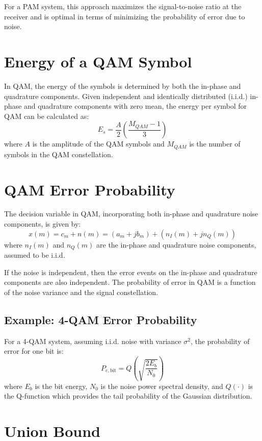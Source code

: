For a PAM system, this approach maximizes the signal-to-noise ratio at the receiver and is optimal in terms of minimizing the probability of error due to noise.
\section*{Energy of a QAM Symbol}

In QAM, the energy of the symbols is determined by both the in-phase and quadrature components. Given independent and identically distributed (i.i.d.) in-phase and quadrature components with zero mean, the energy per symbol for QAM can be calculated as:
\[
E_s = \frac{A}{2} \left( \frac{M_{QAM} - 1}{3} \right)
\]
where \( A \) is the amplitude of the QAM symbols and \( M_{QAM} \) is the number of symbols in the QAM constellation.

\section*{QAM Error Probability}

The decision variable in QAM, incorporating both in-phase and quadrature noise components, is given by:
\[
x(m) = c_m + n(m) = (a_m + jb_m) + (n_I(m) + jn_Q(m))
\]
where \( n_I(m) \) and \( n_Q(m) \) are the in-phase and quadrature noise components, assumed to be i.i.d.

If the noise is independent, then the error events on the in-phase and quadrature components are also independent. The probability of error in QAM is a function of the noise variance and the signal constellation.

\subsection*{Example: 4-QAM Error Probability}

For a 4-QAM system, assuming i.i.d. noise with variance \( \sigma^2 \), the probability of error for one bit is:
\[
P_{e, \text{bit}} = Q\left( \sqrt{\frac{2E_b}{N_0}} \right)
\]
where \( E_b \) is the bit energy, \( N_0 \) is the noise power spectral density, and \( Q(\cdot) \) is the Q-function which provides the tail probability of the Gaussian distribution.



\section*{Union Bound}

